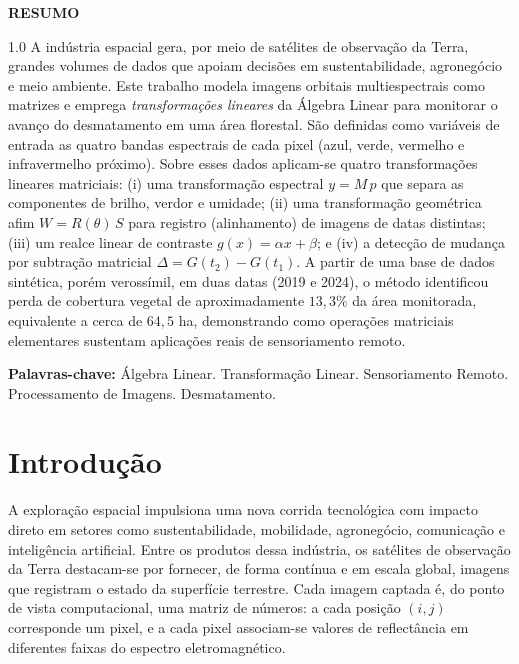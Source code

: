 \documentclass[12pt,a4paper,oneside]{article}
\begin{document}
\thispagestyle{empty}
\begin{center}\textbf{RESUMO}\end{center}
\begin{spacing}{1.0}\noindent
A indústria espacial gera, por meio de satélites de observação da Terra,
grandes volumes de dados que apoiam decisões em sustentabilidade, agronegócio
e meio ambiente. Este trabalho modela imagens orbitais multiespectrais como
matrizes e emprega \emph{transformações lineares} da Álgebra Linear para
monitorar o avanço do desmatamento em uma área florestal. São definidas como
variáveis de entrada as quatro bandas espectrais de cada pixel (azul, verde,
vermelho e infravermelho próximo). Sobre esses dados aplicam-se quatro
transformações lineares matriciais: (i) uma transformação espectral
$y = M\,p$ que separa as componentes de brilho, verdor e umidade; (ii) uma
transformação geométrica afim $W = R(\theta)\,S$ para registro (alinhamento)
de imagens de datas distintas; (iii) um realce linear de contraste
$g(x) = \alpha x + \beta$; e (iv) a detecção de mudança por subtração
matricial $\Delta = G(t_2) - G(t_1)$. A partir de uma base de dados sintética,
porém verossímil, em duas datas (2019 e 2024), o método identificou perda de
cobertura vegetal de aproximadamente $13{,}3\%$ da área monitorada,
equivalente a cerca de $64{,}5$ ha, demonstrando como operações matriciais
elementares sustentam aplicações reais de sensoriamento remoto.
\par\vspace{0.4cm}
\noindent\textbf{Palavras-chave:} Álgebra Linear. Transformação Linear.
Sensoriamento Remoto. Processamento de Imagens. Desmatamento.
\end{spacing}

\newpage
\thispagestyle{empty}
\tableofcontents
\newpage

\setcounter{page}{1}
\pagestyle{plain}

\section{Introdução}
A exploração espacial impulsiona uma nova corrida tecnológica com impacto
direto em setores como sustentabilidade, mobilidade, agronegócio, comunicação
e inteligência artificial. Entre os produtos dessa indústria, os satélites de
observação da Terra destacam-se por fornecer, de forma contínua e em escala
global, imagens que registram o estado da superfície terrestre. Cada imagem
captada é, do ponto de vista computacional, uma matriz de números: a cada
posição $(i,j)$ corresponde um pixel, e a cada pixel associam-se valores de
reflectância em diferentes faixas do espectro eletromagnético.
\end{document}
